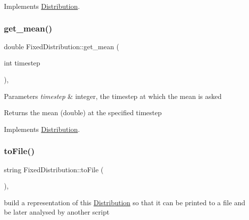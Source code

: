 Implements \mbox{\hyperlink{class_distribution_a742b398af4a461243028cce3c47d8080}{Distribution}}.

\mbox{\label{class_fixed_distribution_af9199f9076551694af2397c7dd69096e}} 
\subsubsection{\texorpdfstring{get\+\_\+mean()}{get\_mean()}}
{\footnotesize\ttfamily double Fixed\+Distribution\+::get\+\_\+mean (\begin{DoxyParamCaption}\item[{int}]{timestep }\end{DoxyParamCaption})\hspace{0.3cm}{\ttfamily [override]}, {\ttfamily [virtual]}}


\begin{DoxyParams}{Parameters}
{\em timestep} & integer, the timestep at which the mean is asked \\
\hline
\end{DoxyParams}
\begin{DoxyReturn}{Returns}
the mean (double) at the specified timestep 
\end{DoxyReturn}


Implements \mbox{\hyperlink{class_distribution_ac9c74d18549f532caa09ae86d8b25b55}{Distribution}}.

\mbox{\label{class_fixed_distribution_a6396ce831e3ff31ecc39bda45e3ecb08}} 
\subsubsection{\texorpdfstring{to\+File()}{toFile()}}
{\footnotesize\ttfamily string Fixed\+Distribution\+::to\+File (\begin{DoxyParamCaption}{ }\end{DoxyParamCaption})\hspace{0.3cm}{\ttfamily [override]}, {\ttfamily [virtual]}}



build a representation of this \mbox{\hyperlink{class_distribution}{Distribution}} so that it can be printed to a file and be later analysed by another script 

